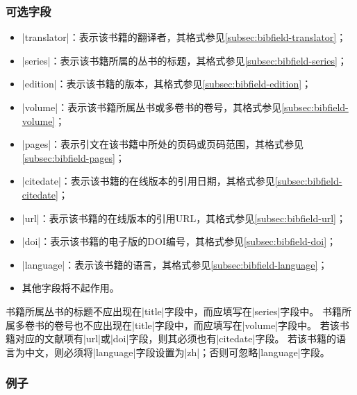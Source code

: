 \subsubsection{可选字段}

\begin{itemize}
\item |translator|：表示该书籍的翻译者，其格式参见\ref{subsec:bibfield-translator}；
\item |series|：表示该书籍所属的丛书的标题，其格式参见\ref{subsec:bibfield-series}；
\item |edition|：表示该书籍的版本，其格式参见\ref{subsec:bibfield-edition}；
\item |volume|：表示该书籍所属丛书或多卷书的卷号，其格式参见\ref{subsec:bibfield-volume}；
\item |pages|：表示引文在该书籍中所处的页码或页码范围，其格式参见\ref{subsec:bibfield-pages}；
\item |citedate|：表示该书籍的在线版本的引用日期，其格式参见\ref{subsec:bibfield-citedate}；
\item |url|：表示该书籍的在线版本的引用URL，其格式参见\ref{subsec:bibfield-url}；
\item |doi|：表示该书籍的电子版的DOI编号，其格式参见\ref{subsec:bibfield-doi}；
\item |language|：表示该书籍的语言，其格式参见\ref{subsec:bibfield-language}；
\item 其他字段将不起作用。
\end{itemize}

\begin{note}
书籍所属丛书的标题不应出现在|title|字段中，而应填写在|series|字段中。
书籍所属多卷书的卷号也不应出现在|title|字段中，而应填写在|volume|字段中。
若该书籍对应的文献项有|url|或|doi|字段，则其必须也有|citedate|字段。
若该书籍的语言为中文，则必须将|language|字段设置为|zh|；否则可忽略|language|字段。
\end{note}

\subsubsection{例子}

